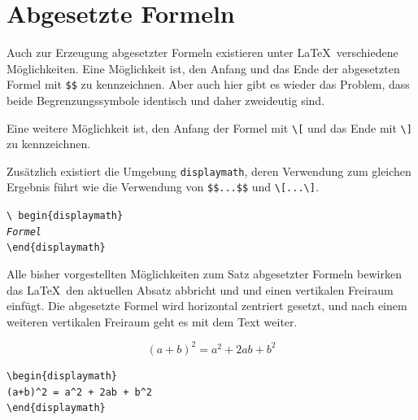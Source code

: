 \documentclass[a4paper,10pt,twoside]{scrbook}
\begin{document}
{\section{Abgesetzte Formeln}

Auch zur Erzeugung abgesetzter Formeln existieren unter \LaTeX\ verschiedene
Möglichkeiten. Eine Möglichkeit ist, den Anfang und 
das Ende der abgesetzten Formel mit \verb!$$! zu kennzeichnen. 
Aber auch hier gibt es wieder das Problem, dass 
beide Begrenzungssymbole identisch und daher zweideutig sind. 



Eine weitere
Möglichkeit ist, den Anfang der Formel mit \verb!\[! und das Ende mit
\verb!\]! zu kennzeichnen.




Zusätzlich existiert die Umgebung \verb!displaymath!, 
deren Verwendung zum
gleichen Ergebnis führt wie die
Verwendung von \verb!$$...$$! und \verb!\[...\]!.

\begin{boxedminipage}{\textwidth}
\texttt{\textbackslash
begin\{displaymath\} \\
\textsl{Formel} \\
\textbackslash end\{displaymath\}}
\end{boxedminipage}


Alle bisher vorgestellten Möglichkeiten zum Satz abgesetzter Formeln bewirken das \LaTeX\ den aktuellen Absatz  
abbricht und und einen vertikalen
Freiraum einfügt. Die abgesetzte 
Formel wird horizontal zentriert 
gesetzt, und nach einem weiteren vertikalen 
Freiraum geht es mit dem Text weiter. 


\begin{minipage}[c]{.48\textwidth}
\setlength{\parskip}{1em}
\begin{displaymath}
(a+b)^2 = a^2 + 2ab + b^2
\end{displaymath}
\end{minipage}
\hfill
\begin{minipage}{.48\textwidth}
\setlength{\parskip}{1em}
\begin{lstlisting}[label=abgesetzteformelnbeispiel, style=customlatex]
\begin{displaymath}
(a+b)^2 = a^2 + 2ab + b^2
\end{displaymath}
\end{lstlisting}
\end{minipage}



}
\end{document}
